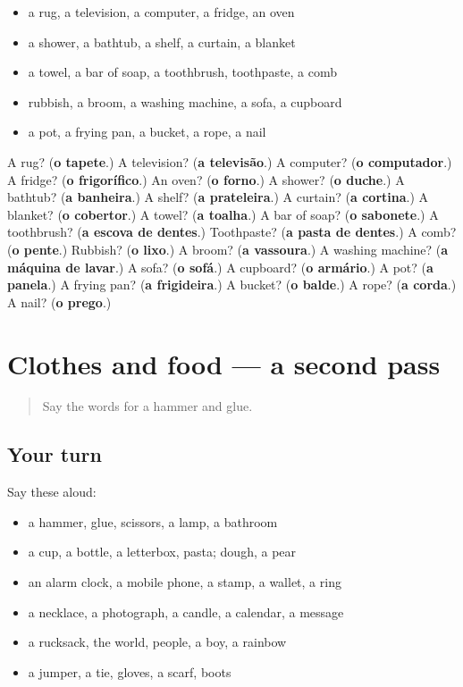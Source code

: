 \begin{itemize}
\raggedright
  \item a rug, a television, a computer, a fridge, an oven
  \item a shower, a bathtub, a shelf, a curtain, a blanket
  \item a towel, a bar of soap, a toothbrush, toothpaste, a comb
  \item rubbish, a broom, a washing machine, a sofa, a cupboard
  \item a pot, a frying pan, a bucket, a rope, a nail
\end{itemize}

\begin{tcolorbox}[breakable,colback=teal!4,colframe=teal!35!black,title={Before you move on}]
A rug? (\textbf{o tapete}.) A television? (\textbf{a televisão}.) A computer? (\textbf{o computador}.) A fridge? (\textbf{o frigorífico}.) An oven? (\textbf{o forno}.) A shower? (\textbf{o duche}.) A bathtub? (\textbf{a banheira}.) A shelf? (\textbf{a prateleira}.) A curtain? (\textbf{a cortina}.) A blanket? (\textbf{o cobertor}.) A towel? (\textbf{a toalha}.) A bar of soap? (\textbf{o sabonete}.) A toothbrush? (\textbf{a escova de dentes}.) Toothpaste? (\textbf{a pasta de dentes}.) A comb? (\textbf{o pente}.) Rubbish? (\textbf{o lixo}.) A broom? (\textbf{a vassoura}.) A washing machine? (\textbf{a máquina de lavar}.) A sofa? (\textbf{o sofá}.) A cupboard? (\textbf{o armário}.) A pot? (\textbf{a panela}.) A frying pan? (\textbf{a frigideira}.) A bucket? (\textbf{o balde}.) A rope? (\textbf{a corda}.) A nail? (\textbf{o prego}.)
\end{tcolorbox}
\section[(dialogue)]{Clothes and food — a second pass}

\label{lesson:PT-R103-second-pass-clothes-and-food}



\begin{quote}
Say the words for a hammer and glue.
\end{quote}

\subsection*{Your turn}
Say these aloud:

\begin{itemize}
\raggedright
  \item a hammer, glue, scissors, a lamp, a bathroom
  \item a cup, a bottle, a letterbox, pasta; dough, a pear
  \item an alarm clock, a mobile phone, a stamp, a wallet, a ring
  \item a necklace, a photograph, a candle, a calendar, a message
  \item a rucksack, the world, people, a boy, a rainbow
  \item a jumper, a tie, gloves, a scarf, boots
\end{itemize}

